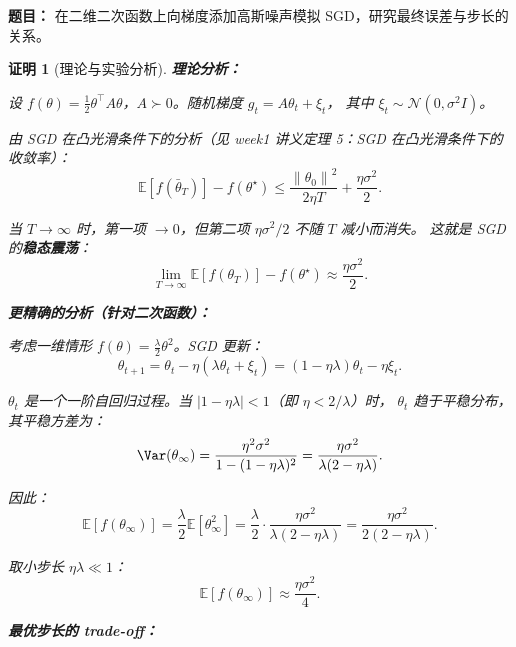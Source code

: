 \documentclass[12pt,a4paper]{ctexart}
\theoremstyle{definition}
\theoremstyle{plain}
\newtheorem*{proof*}{证明}
\newcommand{\E}{\mathbb{E}}
\newcommand{\norm}[1]{\left\lVert #1 \right\rVert}
\begin{document}
\textbf{题目：} 在二维二次函数上向梯度添加高斯噪声模拟 SGD，研究最终误差与步长的关系。

\begin{proof*}[理论与实验分析]

\noindent\textbf{理论分析：}

设 $f(\theta) = \frac12\theta^\top A\theta$，$A \succ 0$。随机梯度 $g_t = A\theta_t + \xi_t$，
其中 $\xi_t \sim \mathcal{N}(0, \sigma^2 I)$。

由 SGD 在凸光滑条件下的分析（见 week1 讲义定理 5：SGD 在凸光滑条件下的收敛率）：
\begin{equation}
  \E[f(\bar\theta_T)] - f(\theta^\star) \le
  \frac{\norm{\theta_0}^2}{2\eta T} + \frac{\eta\sigma^2}{2}.
\end{equation}

当 $T \to \infty$ 时，第一项 $\to 0$，但第二项 $\eta\sigma^2/2$ 不随 $T$ 减小而消失。
这就是 SGD 的\textbf{稳态震荡}：
\begin{equation}
  \boxed{\lim_{T\to\infty} \E[f(\theta_T)] - f(\theta^\star) \approx \frac{\eta\sigma^2}{2}.}
\end{equation}

\noindent\textbf{更精确的分析（针对二次函数）：}

考虑一维情形 $f(\theta) = \frac{\lambda}{2}\theta^2$。SGD 更新：
\begin{equation}
  \theta_{t+1} = \theta_t - \eta(\lambda\theta_t + \xi_t) = (1 - \eta\lambda)\theta_t - \eta\xi_t.
\end{equation}

$\theta_t$ 是一个一阶自回归过程。当 $|1 - \eta\lambda| < 1$（即 $\eta < 2/\lambda$）时，
$\theta_t$ 趋于平稳分布，其平稳方差为：
\begin{equation}
  \Var(\theta_\infty) = \frac{\eta^2\sigma^2}{1 - (1 - \eta\lambda)^2}
  = \frac{\eta\sigma^2}{\lambda(2 - \eta\lambda)}.
\end{equation}

因此：
\begin{equation}
  \E[f(\theta_\infty)] = \frac{\lambda}{2}\E[\theta_\infty^2]
  = \frac{\lambda}{2} \cdot \frac{\eta\sigma^2}{\lambda(2 - \eta\lambda)}
  = \frac{\eta\sigma^2}{2(2 - \eta\lambda)}.
\end{equation}

取小步长 $\eta\lambda \ll 1$：
\begin{equation}
  \E[f(\theta_\infty)] \approx \frac{\eta\sigma^2}{4}.
\end{equation}

\noindent\textbf{最优步长的 trade-off：}


\end{proof*}
\end{document}
